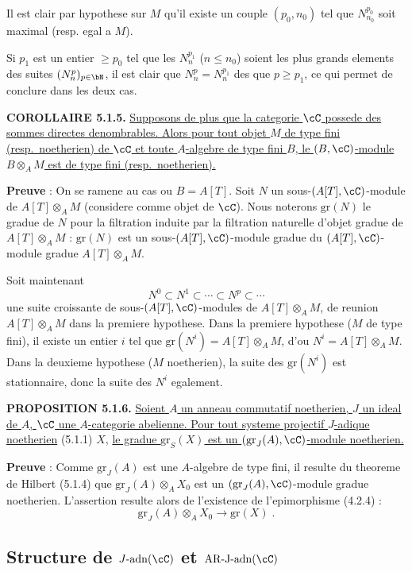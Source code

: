 Il est clair par hypothese sur $M$ qu'il existe un couple $(p_0, n_0)$ tel que $N_{n_0}^{p_0}$ soit maximal (resp. egal a $M$).

Si $p_1$ est un entier $\geq p_0$ tel que les $N_n^{p_1}$ ($n \leq n_0$) soient les plus grands elements des suites $(N_n^p)_{p \in \bN}$, il est clair que $N_n^p = N_n^{p_1}$ des que $p \geq p_1$, ce qui permet de conclure dans les deux cas.

\medskip
\noindent\textbf{COROLLAIRE 5.1.5.} \underline{Supposons de plus que la categorie $\cC$ possede des sommes directes denombrables. Alors pour tout objet $M$ de type fini (resp.\ noetherien) de $\cC$ et toute $A$-algebre de type fini $B$, le $(B,\cC)$-module $B \otimes_A M$ est de type fini (resp.\ noetherien).}

\textbf{Preuve} : On se ramene au cas ou $B = A[T]$. Soit $N$ un sous-$(A[T],\cC)$-module de $A[T] \otimes_A M$ (considere comme objet de $\cC$). Nous noterons $\mathrm{gr}(N)$ le gradue de $N$ pour la filtration induite par la filtration naturelle d'objet gradue de $A[T] \otimes_A M$ : $\mathrm{gr}(N)$ est un sous-$(A[T],\cC)$-module gradue du $(A[T],\cC)$-module gradue $A[T] \otimes_A M$.

Soit maintenant
\[
N^0 \subset N^1 \subset \cdots \subset N^p \subset \cdots
\]
une suite croissante de sous-$(A[T],\cC)$-modules de $A[T] \otimes_A M$, de reunion $A[T] \otimes_A M$ dans la premiere hypothese. Dans la premiere hypothese ($M$ de type fini), il existe un entier $i$ tel que $\mathrm{gr}(N^i) = A[T] \otimes_A M$, d'ou $N^i = A[T] \otimes_A M$. Dans la deuxieme hypothese ($M$ noetherien), la suite des $\mathrm{gr}(N^i)$ est stationnaire, donc la suite des $N^i$ egalement.

\medskip
\noindent\textbf{PROPOSITION 5.1.6.} \underline{Soient $A$ un anneau commutatif noetherien, $J$ un ideal de $A$, $\cC$ une $A$-categorie abelienne. Pour tout systeme projectif $J$-adique noetherien} (5.1.1) $X$, \underline{le gradue $\mathrm{gr}_S(X)$ est un $(\mathrm{gr}_J(A),\cC)$-module noetherien.}

\textbf{Preuve} : Comme $\mathrm{gr}_J(A)$ est une $A$-algebre de type fini, il resulte du theoreme de Hilbert (5.1.4) que $\mathrm{gr}_J(A) \otimes_A X_0$ est un $(\mathrm{gr}_J(A),\cC)$-module gradue noetherien. L'assertion resulte alors de l'existence de l'epimorphisme (4.2.4) :
\[
\mathrm{gr}_J(A) \otimes_A X_0 \longrightarrow \mathrm{gr}(X)\;.
\]

\subsection{Structure de $J\text{-}\mathrm{adn}(\cC)$ et $\mathrm{AR\text{-}J\text{-}adn}(\cC)$}

